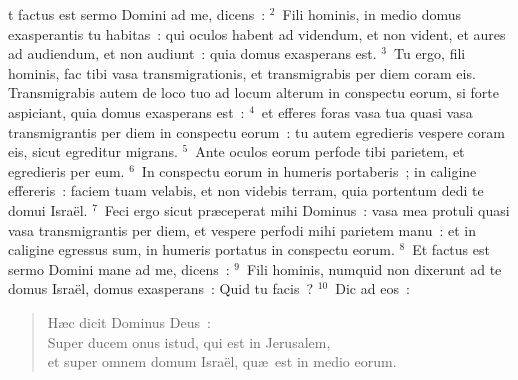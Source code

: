 \bchapter
{}t factus est sermo Domini ad me, dicens~:
${}^{2}$~Fili hominis, in medio domus exasperantis tu habitas~: qui oculos habent ad videndum, et non vident, et aures ad audiendum, et non audiunt~: quia domus exasperans est.
${}^{3}$~Tu ergo, fili hominis, fac tibi vasa transmigrationis, et transmigrabis per diem coram eis. Transmigrabis autem de loco tuo ad locum alterum in conspectu eorum, si forte aspiciant, quia domus exasperans est~:
${}^{4}$~et efferes foras vasa tua quasi vasa transmigrantis per diem in conspectu eorum~: tu autem egredieris vespere coram eis, sicut egreditur migrans.
${}^{5}$~Ante oculos eorum perfode tibi parietem, et egredieris per eum.
${}^{6}$~In conspectu eorum in humeris portaberis~; in caligine effereris~: faciem tuam velabis, et non videbis terram, quia portentum dedi te domui Isra\"el.
${}^{7}$~Feci ergo sicut pr\ae ceperat mihi Dominus~: vasa mea protuli quasi vasa transmigrantis per diem, et vespere perfodi mihi parietem manu~: et in caligine egressus sum, in humeris portatus in conspectu eorum.
${}^{8}$~Et factus est sermo Domini mane ad me, dicens~:
${}^{9}$~Fili hominis, numquid non dixerunt ad te domus Isra\"el, domus exasperans~: Quid tu facis~?
${}^{10}$~Dic ad eos~: \begin{flushleft}\begin{verse}H\ae c dicit Dominus Deus~:\\ Super ducem onus istud, qui est in Jerusalem,\\ et super omnem domum Isra\"el, qu\ae\ est in medio eorum.\end{verse}\end{flushleft}


